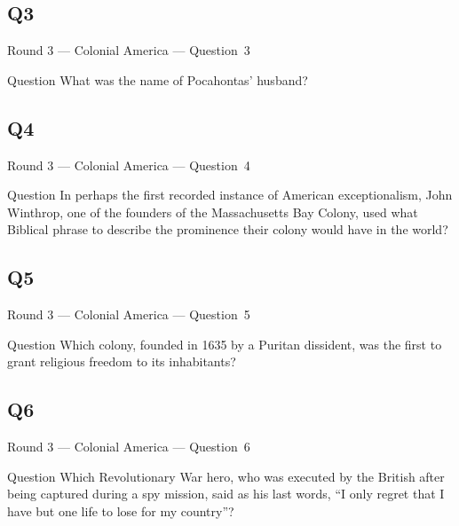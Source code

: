\documentclass[11pt]{beamer}
\begin{document}
\subsection*{Q3}
\begin{frame}[t]{Round 3 --- Colonial America --- \mbox{Question 3}}
    \vspace{-0.5em}
    \begin{block}{Question}
        What was the name of Pocahontas' husband?
    \end{block}
\end{frame}
\subsection*{Q4}
\begin{frame}[t]{Round 3 --- Colonial America --- \mbox{Question 4}}
    \vspace{-0.5em}
    \begin{block}{Question}
        In perhaps the first recorded instance of American exceptionalism, John Winthrop, one of the founders of the Massachusetts Bay Colony, used what Biblical phrase to describe the prominence their colony would have in the world?
    \end{block}
\end{frame}
\subsection*{Q5}
\begin{frame}[t]{Round 3 --- Colonial America --- \mbox{Question 5}}
    \vspace{-0.5em}
    \begin{block}{Question}
        Which colony, founded in 1635 by a Puritan dissident, was the first to grant religious freedom to its inhabitants?
    \end{block}
\end{frame}
\subsection*{Q6}
\begin{frame}[t]{Round 3 --- Colonial America --- \mbox{Question 6}}
    \vspace{-0.5em}
    \begin{block}{Question}
        Which Revolutionary War hero, who was executed by the British after being captured during a spy mission, said as his last words, ``I only regret that I have but one life to lose for my country''?
    \end{block}
\end{frame}
\end{document}
